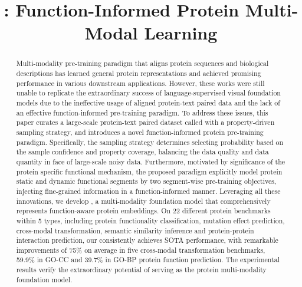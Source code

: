 \title{\ourapproach: Function-Informed Protein Multi-Modal Learning}



\maketitle

\begin{abstract}
Multi-modality pre-training paradigm that aligns protein sequences and biological descriptions has learned general protein representations and achieved promising performance in various downstream applications. However, these works were still unable to replicate the extraordinary success of language-supervised visual foundation models due to the ineffective usage of aligned protein-text paired data and the lack of an effective function-informed pre-training paradigm. To address these issues, this paper curates a large-scale protein-text paired dataset called \ourdataset with a property-driven sampling strategy, and introduces a novel function-informed protein pre-training paradigm. Specifically, the sampling strategy determines selecting probability based on the sample confidence and property coverage, balancing the data quality and data quantity in face of large-scale noisy data. Furthermore, motivated by significance of the protein specific functional mechanism, the proposed paradigm explicitly model protein static and dynamic functional segments by two segment-wise pre-training objectives, injecting fine-grained information in a function-informed manner.
Leveraging all these innovations, we develop \ourapproach, a multi-modality foundation model that comprehensively represents function-aware protein embeddings.
On 22 different protein benchmarks within 5 types, including protein functionality classification, mutation effect prediction, cross-modal transformation, semantic similarity inference and protein-protein interaction prediction, our \ourapproach consistently achieves SOTA performance, with remarkable improvements of 75\% on average in five cross-modal transformation benchmarks, 59.9\% in GO-CC and 39.7\% in GO-BP 
protein function prediction. The experimental results verify the extraordinary potential of \ourapproach serving as the protein multi-modality foundation model.
\end{abstract}


